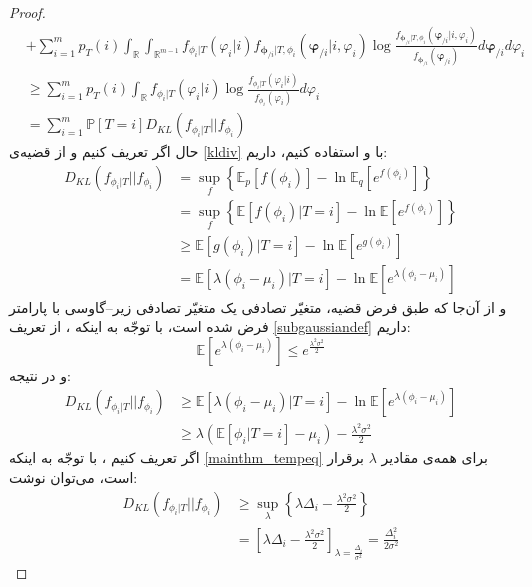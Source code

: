 \documentclass[a4paper,12pt]{article}
\newcommand{\E}{\mathbb{E}}
\newcommand{\Prob}{\mathbb{P}}
\newcommand{\bfphi}{\bm {\phi}}
\newcommand{\R}{\mathbb{R}}
\begin{document}
\begin{proof}
\begin{align}
		&+ \sum_{i = 1}^{m} p_T(i) \int_{\R}\int_{\R^{m-1}} f_{\phi_i|T}(\varphi_i|i) f_{\bfphi_{/i}|T,\phi_i}(\bm{\varphi}_{/i}|i,\varphi_i) \log\frac{f_{\bfphi_{/i}|T,\phi_i}(\bm{\varphi}_{/i}|i,\varphi_i)}{f_{\bm{\phi}_{/i}}(\bm{\varphi}_{/i})}d\bm{\varphi}_{/i}d\varphi_i\\
		&\geq \sum_{i = 1}^{m} p_T(i) \int_{\R}f_{\phi_i|T}(\varphi_i|i) \log\frac{f_{\phi_i|T}(\varphi_i|i)}{f_{\phi_i}(\varphi_i)} d\varphi_i\\
		&= \sum_{i = 1}^{m} \Prob[T=i]D_{KL}(f_{\phi_i|T}||f_{\phi_i})\label{mainthm_tempeq2}
		\end{align}
		حال اگر تعریف کنیم
		و از قضیه‌ی
		\eqref{kldiv}
		با 
		و
		استفاده کنیم، داریم:
		\begin{align}
		D_{KL}(f_{\phi_i|T}||f_{\phi_i}) &= \sup_f\left\{\E_p[f(\phi_i)]-\ln\E_q[e^{f(\phi_i)}]\right\}\\
		&= \sup_f\left\{\E[f(\phi_i)|T=i]-\ln\E[e^{f(\phi_i)}]\right\}\\
		&\geq \E[g(\phi_i)|T=i]-\ln\E[e^{g(\phi_i)}]\\
		&= \E[\lambda(\phi_i-\mu_i)|T=i] - \ln\E[e^{\lambda(\phi_i-\mu_i)}]
		\end{align}
		و از آن‌جا که طبق فرض قضیه، متغیّر تصادفی
		یک متغیّر تصادفی زیر--گاوسی با پارامتر
		\lr{$\sigma$}
		فرض شده است، با توجّه به اینکه 
		\lr{$\E[\phi_i - \mu_i] = \E[\phi_i] - \mu_i = \mu_i - \mu_i = 0$}،
		از تعریف 
		\eqref{subgaussiandef}
		داریم:
		\begin{equation}
		\E[e^{\lambda(\phi_i-\mu_i)}] \leq e^{\frac{\lambda^2\sigma^2}{2}}
		\end{equation}
		و در نتیجه:
		\begin{align}
		D_{KL}(f_{\phi_i|T}||f_{\phi_i}) &\geq \E[\lambda(\phi_i-\mu_i)|T=i] - \ln\E[e^{\lambda(\phi_i-\mu_i)}]\label{mainthm_tempeq}\\
		&\geq \lambda(\E[\phi_i|T=i]-\mu_i) - \frac{\lambda^2\sigma^2}{2}
		\end{align}
		اگر تعریف کنیم
		\lr{$\Delta_i = \E[\phi_i|T=i]-\mu_i$}،
		با توجّه به اینکه 
		\eqref{mainthm_tempeq}
		برای همه‌ی مقادیر
		$\lambda$
		برقرار است، می‌توان نوشت:
		\begin{align}
		D_{KL}(f_{\phi_i|T}||f_{\phi_i}) &\geq \sup_{\lambda}\left\{\lambda\Delta_i-\frac{\lambda^2\sigma^2}{2}\right\}\\
		&= \left[\lambda\Delta_i-\frac{\lambda^2\sigma^2}{2}\right]_{\lambda=\frac{\Delta_i}{\sigma^2}} = \frac{\Delta_i^2}{2\sigma^2}\label{mainthm_tempeq3}

\end{align}
\end{proof}
\end{document}
